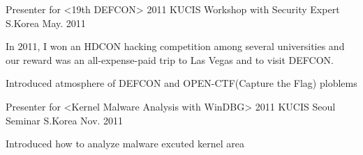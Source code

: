 \begin{cventries}
  \cventry
    {Presenter for <19th DEFCON>}
    {2011 KUCIS Workshop with Security Expert}
    {S.Korea}
    {May. 2011}
    {
      \begin{cvitems}
        \item {In 2011, I won an HDCON hacking competition among several universities and our reward was an all-expense-paid trip to Las Vegas and to visit DEFCON.}
        \item {Introduced atmosphere of DEFCON and OPEN-CTF(Capture the Flag) ploblems}
      \end{cvitems}
    }
  \cventry
    {Presenter for <Kernel Malware Analysis with WinDBG>}
    {2011 KUCIS Seoul Seminar}
    {S.Korea}
    {Nov. 2011}
    {
      \begin{cvitems}
        \item {Introduced how to analyze malware excuted kernel area}
      \end{cvitems}
    }
\end{cventries}
